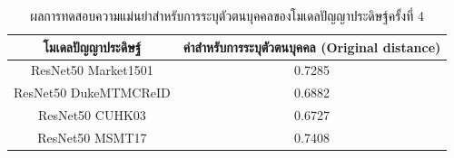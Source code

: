 \begin{table}[!ht]
    \centering
    \begin{tabular}{|c|c|}
		\hline
		{โมเดลปัญญาประดิษฐ์}&{ค่าสำหรับการระบุตัวตนบุคคล (Original distance)}							\\
		\hline
		ResNet50 Market1501	 			& 0.7285								\\
		ResNet50 DukeMTMCReID			& 0.6882								\\
		ResNet50 CUHK03				& 0.6727								\\
		ResNet50 MSMT17				& 0.7408								\\
	\hline
    \end{tabular}
    \caption{ผลการทดสอบความแม่นยำสำหรับการระบุตัวตนบุคคลของโมเดลปัญญาประดิษฐ์ครั้งที่ 4}
    \label{tab: Original distant of image 4}
\end{table}
\begin{figure}[!ht]
    \centering
    \begin{subfigure}[b]{0.1\textwidth}
        \centering

\end{subfigure}
\end{figure}
